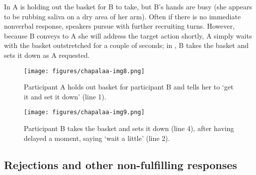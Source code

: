 \documentclass[output=paper]{langsci/langscibook}
\begin{document}
\normalsize
In  A is holding out the basket for B to take, but B's hands are busy (she appears to be rubbing saliva on a dry area of her arm). Often if there is no immediate nonverbal response, speakers pursue with further recruiting turns. However, because B conveys to A she will address the target action shortly, A simply waits with the basket outstretched for a couple of seconds; in , B takes the basket and sets it down as A requested.

\begin{figure}
\texttt{[image: figures/chapalaa-img8.png]}
\caption{\label{fig:floyd:6} Participant A holds out basket for participant B and tells her to ‘get it and set it down’ (line 1).}
\end{figure}

\begin{figure}
\texttt{[image: figures/chapalaa-img9.png]}
\caption{\label{fig:floyd:7} Participant B takes the basket and sets it down (line 4), after having delayed a moment, saying ‘wait a little’ (line 2). }
\end{figure}

\subsection{Rejections and other non-fulfilling responses}\label{sec:floyd:4.3}
\end{document}

